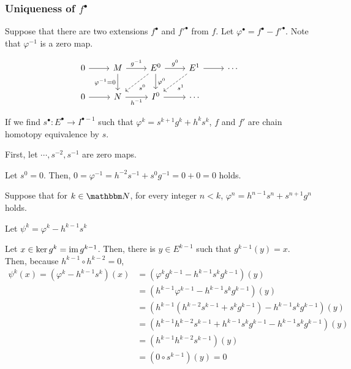 
\subsubsection*{Uniqueness of \(f^\bullet\)}

Suppose that there are two extensions \(f^\bullet\) and \(f'^\bullet\) from \(f\).
Let \(\varphi^\bullet = f^\bullet - f'^\bullet\).
Note that \(\varphi^{-1}\) is a zero map.

\[\begin{tikzcd}
  0 \ar{r} & M \ar[swap, "\varphi^{-1} = 0"]{d} \ar["g^{-1}"]{r} & E^0 \ar["\varphi^{0}"]{d} \ar["g^{0}"]{r} \ar[dashed, "s^0"]{ld} & E^1 \ar{r} \ar[dashed, "s^1"]{ld} & \cdots \\
  0 \ar{r} & N \ar[swap,"h^{-1}"]{r} & I^0 \ar{r} &  \cdots
\end{tikzcd}\]

If we find \(s^\bullet: E^{\bullet} \to I^{\bullet - 1}\) such that
\(\varphi^k = s^{k + 1} g^k + h^k s^k\), \(f\) and \(f'\) are chain homotopy equivalence by \(s\).

First, let \(\cdots, s^{-2}, s^{-1}\) are zero maps.

Let \(s^{0} = 0\).
Then, \(0 = \varphi^{-1} = h^{-2}s^{-1} + s^{0}g^{-1} = 0 + 0 = 0\) holds.

Suppose that for \(k \in \bbN\), for every integer \(n < k\),
\(\varphi^{n} = h^{n - 1}s^{n} + s^{n + 1}g^{n}\) holds.

Let \(\psi^{k} = \varphi^k - h^{k - 1}s^{k}\)

Let \(x \in \ker g^k = \textnormal{im}\, g^{k - 1}\). Then, there is \(y \in E^{k - 1}\) such that \(g^{k - 1}(y) = x\). Then, because \(h^{k - 1} \circ h^{k - 2} = 0\),
\begin{align*}
  \psi^k (x)
  = (\varphi^k - h^{k - 1}s^{k}) (x)
  &= (\varphi^k g^{k - 1} - h^{k - 1}s^{k}g^{k - 1}) (y)
  \\&= ( h^{k - 1} \varphi^{k - 1} - h^{k - 1}s^{k}g^{k - 1}) (y)
  \\&= ( h^{k - 1}(h^{k - 2}s^{k - 1} + s^{k}g^{k - 1}) - h^{k - 1}s^{k}g^{k - 1}) (y)
  \\&= ( h^{k - 1}h^{k - 2}s^{k - 1} + h^{k - 1}s^{k}g^{k - 1} - h^{k - 1}s^{k}g^{k - 1}) (y)
  \\&= ( h^{k - 1}h^{k - 2}s^{k - 1}) (y)
  \\&= ( 0 \circ s^{k - 1}) (y) = 0
\end{align*}

